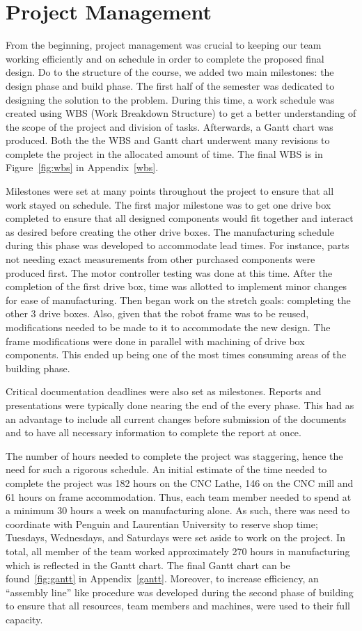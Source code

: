 \section{Project Management}

From the beginning, project management was crucial to keeping our team working efficiently and on schedule in order to complete the proposed final design. Do to the structure of the course, we added two main milestones: the design phase and build phase. The first half of the semester was dedicated to designing the solution to the problem. During this time, a work schedule was created using WBS (Work Breakdown Structure) to get a better understanding of the scope of the project and division of tasks. Afterwards, a Gantt chart was produced. Both the the WBS and Gantt chart underwent many revisions to complete the project in the allocated amount of time. The final WBS is in Figure~\ref{fig:wbs} in Appendix~\ref{wbs}.

Milestones were set at many points throughout the project to ensure that all work stayed on schedule. The first major milestone was to get one drive box completed to ensure that all designed components would fit together and interact as desired before creating the other drive boxes. The manufacturing schedule during this phase was developed to accommodate lead times. For instance, parts not needing exact measurements from other purchased components were produced first. The motor controller testing was done at this time. After the completion of the first drive box, time was allotted to implement minor changes for ease of manufacturing. Then began work on the stretch goals: completing the other 3 drive boxes. Also, given that the robot frame was to be reused, modifications needed to be made to it to accommodate the new design. The frame modifications were done in parallel with machining of drive box components. This ended up being one of the most times consuming areas of the building phase.

Critical documentation deadlines were also set as milestones. Reports and presentations were typically done nearing the end of the every phase. This had as an advantage to include all current changes before submission of the documents and to have all necessary information to complete the report at once. 

The number of hours needed to complete the project was staggering, hence the need for such a rigorous schedule. An initial estimate of the time needed to complete the project was 182 hours on the CNC Lathe, 146 on the CNC mill and 61 hours on frame accommodation. Thus, each team member needed to spend at a minimum 30 hours a week on manufacturing alone. As such, there was need to coordinate with Penguin and Laurentian University to reserve shop time; Tuesdays, Wednesdays, and Saturdays were set aside to work on the project. In total, all member of the team worked approximately 270 hours in manufacturing which is reflected in the Gantt chart. The final Gantt chart can be found~\ref{fig:gantt} in Appendix~\ref{gantt}. Moreover, to increase efficiency, an ``assembly line'' like procedure was developed during the second phase of building to ensure that all resources, team members and machines, were used to their full capacity.